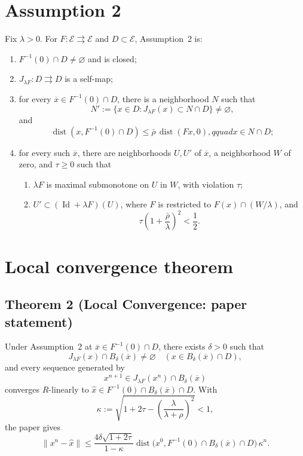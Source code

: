 \documentclass[11pt]{article}
\newcommand{\E}{\mathcal E}
\newcommand{\dist}{\operatorname{dist}}
\newcommand{\Id}{\operatorname{Id}}
\newcommand{\barx}{\overline{x}}
\newcommand{\bx}{\widehat{x}}
\begin{document}
\section{Assumption 2}

Fix \(\lambda>0\). For \(F:\E\rightrightarrows\E\) and \(D\subset\E\), Assumption~2 is:
\begin{enumerate}[label=(\alph*)]
\item \(F^{-1}(0)\cap D\ne\varnothing\) and is closed;
\item \(J_{\lambda F}:D\rightrightarrows D\) is a self-map;
\item for every \(\barx\in F^{-1}(0)\cap D\), there is a neighborhood \(N\) such that
\[
N':=\{x\in D:J_{\lambda F}(x)\subset N\cap D\}\ne\varnothing,
\]
and
\begin{equation}
 \dist(x,F^{-1}(0)\cap D)\le\bar\rho\,\dist(Fx,0),qquad x\in N\cap D;                 \tag{27}
\end{equation}
\item for every such \(\barx\), there are neighborhoods \(U,U'\) of \(\barx\), a neighborhood \(W\) of zero, and \(\tau\ge0\) such that
\begin{enumerate}[label=\roman*.]
\item \(\lambda F\) is maximal submonotone on \(U\) in \(W\), with violation \(\tau\);
\item \(U'\subset(\Id+\lambda F)(U)\), where \(F\) is restricted to \(F(x)\cap(W/\lambda)\), and
\[
 \tau\left(1+\frac{\bar\rho}{\lambda}\right)^2<\frac12 .
\]
\end{enumerate}
\end{enumerate}

\section{Local convergence theorem}

\subsection*{Theorem 2 (Local Convergence: paper statement)}

Under Assumption~2 at \(\barx\in F^{-1}(0)\cap D\), there exists \(\delta>0\) such that
\[
J_{\lambda F}(x)\cap B_\delta(\barx)\ne\varnothing\quad
(x\in B_\delta(\barx)\cap D),
\]
and every sequence generated by
\[
x^{n+1}\in J_{\lambda F}(x^n)\cap B_\delta(\barx)
\]
converges \(R\)-linearly to \(\bx\in F^{-1}(0)\cap B_\delta(\barx)\cap D\). With
\[
\kappa:=\sqrt{1+2\tau-\left(\frac{\lambda}{\lambda+\rho}\right)^2}<1,
\]
the paper gives
\begin{equation}
 \|x^n-\bx\|
 \le \frac{4\delta\sqrt{1+2\tau}}{1-\kappa}
 \dist\bigl(x^0,F^{-1}(0)\cap B_\delta(\barx)\cap D\bigr)\,\kappa^n .       \tag{T2}
\end{equation}
\end{document}
